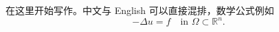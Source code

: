 \documentclass[11pt,a4paper,UTF8,fontset=fandol]{ctexart}
\newcommand{\R}{\mathbb{R}}
\newcommand{\Om}{\Omega}
\begin{document}
在这里开始写作。中文与 English 可以直接混排，数学公式例如
\begin{equation}\label{eq:first}
  -\Delta u = f \quad \text{in } \Om\subset\R^n .
\end{equation}
\end{document}
